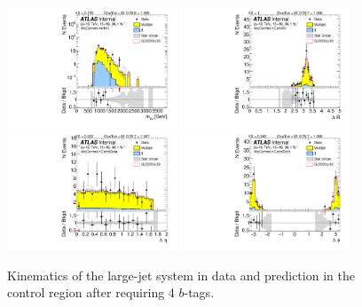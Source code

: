 \begin{figure}[htbp!]
\begin{center}
\includegraphics[width=0.45\textwidth,angle=-90]{figures/boosted/Control/b77_FourTag_Control_mHH_l_1.pdf}
\includegraphics[width=0.45\textwidth,angle=-90]{figures/boosted/Control/b77_FourTag_Control_hCandDr.pdf}\\
\includegraphics[width=0.45\textwidth,angle=-90]{figures/boosted/Control/b77_FourTag_Control_hCandDeta.pdf}
\includegraphics[width=0.45\textwidth,angle=-90]{figures/boosted/Control/b77_FourTag_Control_hCandDphi.pdf}
  \caption{Kinematics of the large-\R jet system in data and prediction in the control region after requiring 4 $b$-tags.  }
  \label{fig:boosted-4b-control-ak10-system}
\end{center}
\end{figure}

